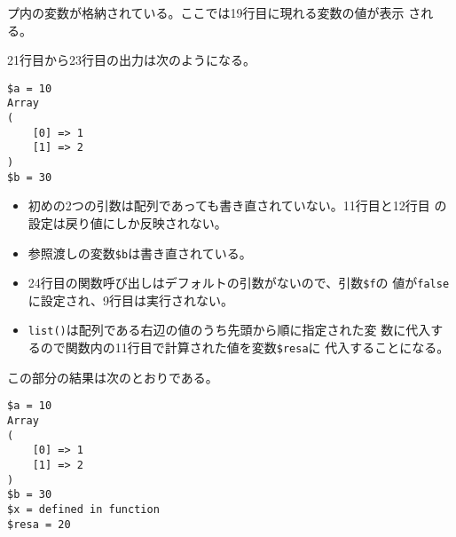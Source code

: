 \begin{Exec}
\begin{itemize}
       プ内の変数が格納されている。ここでは19行目に現れる変数の値が表示
       される。
\end{itemize}
21行目から23行目の出力は次のようになる。
\begin{Verbatim}
$a = 10
Array
(
    [0] => 1
    [1] => 2
)
$b = 30
\end{Verbatim}
\begin{itemize}
 \item 初めの2つの引数は配列であっても書き直されていない。11行目と12行目
       の設定は戻り値にしか反映されない。
 \item 参照渡しの変数\Verb+$b+は書き直されている。
\end{itemize}
 \iffalse
 \begin{listingcont}
list($resa) = example($a, $as, $b);
print "\$resa = $resa\n";
?>
 \end{listingcont}
 \fi
 \begin{itemize}
 \item 24行目の関数呼び出しはデフォルトの引数がないので、引数\Verb+$f+の
       値が\texttt{false}に設定され、9行目は実行されない。
 \item \texttt{list()}は配列である右辺の値のうち先頭から順に指定された変
       数に代入するので関数内の11行目で計算された値を変数\Verb+$resa+に
       代入することになる。
 \end{itemize}
この部分の結果は次のとおりである。
\begin{Verbatim}
$a = 10
Array
(
    [0] => 1
    [1] => 2
)
$b = 30
$x = defined in function
$resa = 20
\end{Verbatim}
\end{Exec}
\iffalse%

